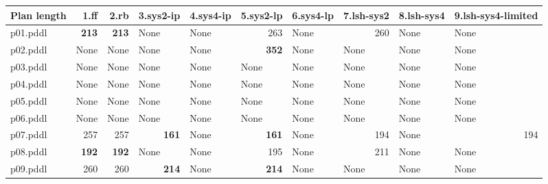 \documentclass{article}
\begin{document}
\begin{tabular}{@{}lrrrrrrrrr@{}}
Plan length & 1.ff & 2.rb & 3.sys2-ip & 4.sys4-ip & 5.sys2-lp & 6.sys4-lp & 7.lsh-sys2 & 8.lsh-sys4 & 9.lsh-sys4-limited \\
\midrule
p01.pddl & \textbf{213} & \textbf{213} & \multicolumn{1}{|l|}{None} & \multicolumn{1}{|l|}{None} & 263 & \multicolumn{1}{|l|}{None} & 260 & \multicolumn{1}{|l|}{None} & \multicolumn{1}{|l|}{None} \\
p02.pddl & \multicolumn{1}{|l|}{None} & \multicolumn{1}{|l|}{None} & \multicolumn{1}{|l|}{None} & \multicolumn{1}{|l|}{None} & \textbf{352} & \multicolumn{1}{|l|}{None} & \multicolumn{1}{|l|}{None} & \multicolumn{1}{|l|}{None} & \multicolumn{1}{|l|}{None} \\
p03.pddl & \multicolumn{1}{|l|}{None} & \multicolumn{1}{|l|}{None} & \multicolumn{1}{|l|}{None} & \multicolumn{1}{|l|}{None} & \multicolumn{1}{|l|}{None} & \multicolumn{1}{|l|}{None} & \multicolumn{1}{|l|}{None} & \multicolumn{1}{|l|}{None} & \multicolumn{1}{|l|}{None} \\
p04.pddl & \multicolumn{1}{|l|}{None} & \multicolumn{1}{|l|}{None} & \multicolumn{1}{|l|}{None} & \multicolumn{1}{|l|}{None} & \multicolumn{1}{|l|}{None} & \multicolumn{1}{|l|}{None} & \multicolumn{1}{|l|}{None} & \multicolumn{1}{|l|}{None} & \multicolumn{1}{|l|}{None} \\
p05.pddl & \multicolumn{1}{|l|}{None} & \multicolumn{1}{|l|}{None} & \multicolumn{1}{|l|}{None} & \multicolumn{1}{|l|}{None} & \multicolumn{1}{|l|}{None} & \multicolumn{1}{|l|}{None} & \multicolumn{1}{|l|}{None} & \multicolumn{1}{|l|}{None} & \multicolumn{1}{|l|}{None} \\
p06.pddl & \multicolumn{1}{|l|}{None} & \multicolumn{1}{|l|}{None} & \multicolumn{1}{|l|}{None} & \multicolumn{1}{|l|}{None} & \multicolumn{1}{|l|}{None} & \multicolumn{1}{|l|}{None} & \multicolumn{1}{|l|}{None} & \multicolumn{1}{|l|}{None} & \multicolumn{1}{|l|}{None} \\
p07.pddl & 257 & 257 & \textbf{161} & \multicolumn{1}{|l|}{None} & \textbf{161} & \multicolumn{1}{|l|}{None} & 194 & \multicolumn{1}{|l|}{None} & 194 \\
p08.pddl & \textbf{192} & \textbf{192} & \multicolumn{1}{|l|}{None} & \multicolumn{1}{|l|}{None} & 195 & \multicolumn{1}{|l|}{None} & 211 & \multicolumn{1}{|l|}{None} & \multicolumn{1}{|l|}{None} \\
p09.pddl & 260 & 260 & \textbf{214} & \multicolumn{1}{|l|}{None} & \textbf{214} & \multicolumn{1}{|l|}{None} & \multicolumn{1}{|l|}{None} & \multicolumn{1}{|l|}{None} & \multicolumn{1}{|l|}{None} \\

\end{tabular}
\end{document}
